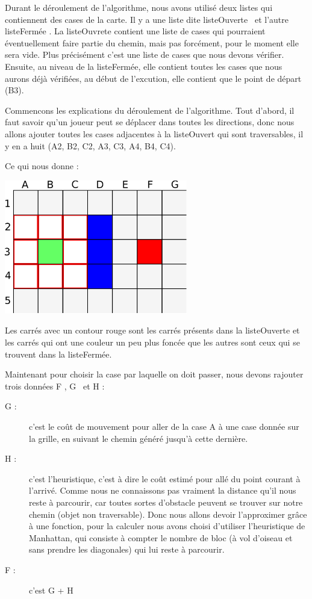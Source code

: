 		
			Durant le déroulement de l'algorithme, nous avons utilisé deux listes qui contiennent des cases de la carte.
			Il y a une liste dite \og listeOuverte \fg \, et l'autre \og listeFermée \fg.
			La listeOuvrete contient une liste de cases qui pourraient éventuellement faire partie du chemin, mais pas forcément, pour le moment elle sera vide.
			Plus précisément c'est une liste de cases que nous devons vérifier.
			Ensuite, au niveau de la listeFermée, elle contient toutes les cases que nous
			aurons déjà vérifiées, au début de l'excution, elle contient que le point de départ (B3).
			
		
			Commencons les explications du déroulement de l'algorithme.
			Tout d'abord, il faut savoir qu'un joueur peut se déplacer dans toutes les
			directions, donc nous allons ajouter toutes les cases adjacentes à la
			listeOuvert qui sont traversables, il y en a huit (A2, B2, C2, A3, C3, A4, B4, C4).
			
			
			Ce qui nous donne :
		
			\begin{center}
				\includegraphics[width=8cm]{./Analyse/Img/Grille2.eps}
			\end{center}
		
			Les carrés avec un contour rouge sont les carrés présents dans la
			listeOuverte et les carrés qui ont une couleur un peu plus foncée que les
			autres sont ceux qui se trouvent dans la listeFermée.
		
			Maintenant pour choisir la case par laquelle on doit passer, nous devons rajouter trois données \og F \fg , \og G \fg \, et \og H \fg:
			\begin{description}
				\item[G : ]{c'est le coût de mouvement pour aller de la case A à une case donnée sur la grille, en suivant le chemin généré jusqu'à cette dernière.}
				\item[H :]{c'est l'heuristique, c'est à dire le coût estimé pour allé du point courant à l'arrivé. Comme nous ne connaissons pas vraiment la distance qu'il nous reste à parcourir, car toutes sortes d'obstacle peuvent se trouver sur notre chemin (objet non traversable). Donc nous allons devoir l'approximer grâce à une fonction, pour la calculer nous avons choisi d'utiliser l'heuristique de Manhattan, qui consiste à compter le nombre de bloc (à vol d'oiseau et sans prendre les diagonales) qui lui reste à parcourir.}
				\item[F :]{c'est G + H}
			\end{description} 
		
